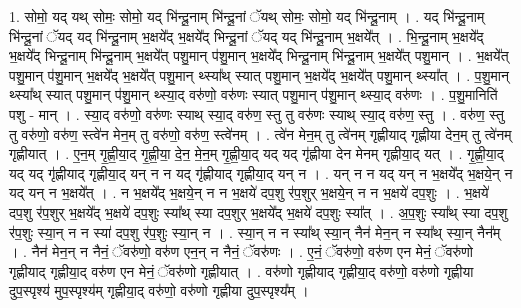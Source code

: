 \documentclass[17pt]{extarticle}
\begin{document}
1. सोमो॒ यद् यथ् सोमः॒ सोमो॒ यद् भि॑न्दू॒नाम् भि॑न्दू॒नां ॅयथ् सोमः॒ सोमो॒ यद् भि॑न्दू॒नाम् । . यद् भि॑न्दू॒नाम् भि॑न्दू॒नां ॅयद् यद् भि॑न्दू॒नाम् भ॒क्षये᳚द् भ॒क्षये᳚द् भिन्दू॒नां ॅयद् यद् भि॑न्दू॒नाम् भ॒क्षये᳚त् । . भि॒न्दू॒नाम् भ॒क्षये᳚द् भ॒क्षये᳚द् भिन्दू॒नाम् भि॑न्दू॒नाम् भ॒क्षये᳚त् पशु॒मान् प॑शु॒मान् भ॒क्षये᳚द् भिन्दू॒नाम् भि॑न्दू॒नाम् भ॒क्षये᳚त् पशु॒मान् । . भ॒क्षये᳚त् पशु॒मान् प॑शु॒मान् भ॒क्षये᳚द् भ॒क्षये᳚त् पशु॒मान् थ्स्या᳚थ् स्यात् पशु॒मान् भ॒क्षये᳚द् भ॒क्षये᳚त् पशु॒मान् थ्स्या᳚त् । . प॒शु॒मान् थ्स्या᳚थ् स्यात् पशु॒मान् प॑शु॒मान् थ्स्या॒द् वरु॑णो॒ वरु॑णः स्यात् पशु॒मान् प॑शु॒मान् थ्स्या॒द् वरु॑णः । . प॒शु॒मानिति॑ पशु - मान् । . स्या॒द् वरु॑णो॒ वरु॑णः स्याथ् स्या॒द् वरु॑ण॒ स्तु तु वरु॑णः स्याथ् स्या॒द् वरु॑ण॒ स्तु । . वरु॑ण॒ स्तु तु वरु॑णो॒ वरु॑ण॒ स्त्वे॑न मेन॒म् तु वरु॑णो॒ वरु॑ण॒ स्त्वे॑नम् । . त्वे॑न मेन॒म् तु त्वे॑नम् गृह्णीयाद् गृह्णीया देन॒म् तु त्वे॑नम् गृह्णीयात् । . ए॒न॒म् गृ॒ह्णी॒या॒द् गृ॒ह्णी॒या॒ दे॒न॒ मे॒न॒म् गृ॒ह्णी॒या॒द् यद् यद् गृ॑ह्णीया देन मेनम् गृह्णीया॒द् यत् । . गृ॒ह्णी॒या॒द् यद् यद् गृ॑ह्णीयाद् गृह्णीया॒द् यन् न न यद् गृ॑ह्णीयाद् गृह्णीया॒द् यन् न । . यन् न न यद् यन् न भ॒क्षये᳚द् भ॒क्षये॒न् न यद् यन् न भ॒क्षये᳚त् । . न भ॒क्षये᳚द् भ॒क्षये॒न् न न भ॒क्षये॑ दप॒शु र॑प॒शुर् भ॒क्षये॒न् न न भ॒क्षये॑ दप॒शुः । . भ॒क्षये॑ दप॒शु र॑प॒शुर् भ॒क्षये᳚द् भ॒क्षये॑ दप॒शुः स्या᳚थ् स्या दप॒शुर् भ॒क्षये᳚द् भ॒क्षये॑ दप॒शुः स्या᳚त् । . अ॒प॒शुः स्या᳚थ् स्या दप॒शु र॑प॒शुः स्या॒न् न न स्या॑ दप॒शु र॑प॒शुः स्या॒न् न । . स्या॒न् न न स्या᳚थ् स्या॒न् नैन॑ मेन॒न् न स्या᳚थ् स्या॒न् नैन᳚म् । . नैन॑ मेन॒न् न नैनं॒ ॅवरु॑णो॒ वरु॑ण एन॒न् न नैनं॒ ॅवरु॑णः । . ए॒नं॒ ॅवरु॑णो॒ वरु॑ण एन मेनं॒ ॅवरु॑णो गृह्णीयाद् गृह्णीया॒द् वरु॑ण एन मेनं॒ ॅवरु॑णो गृह्णीयात् । . वरु॑णो गृह्णीयाद् गृह्णीया॒द् वरु॑णो॒ वरु॑णो गृह्णीया दुप॒स्पृश्य॑ मुप॒स्पृश्य॑म् गृह्णीया॒द् वरु॑णो॒ वरु॑णो गृह्णीया दुप॒स्पृश्य᳚म् । \newline
\end{document}
